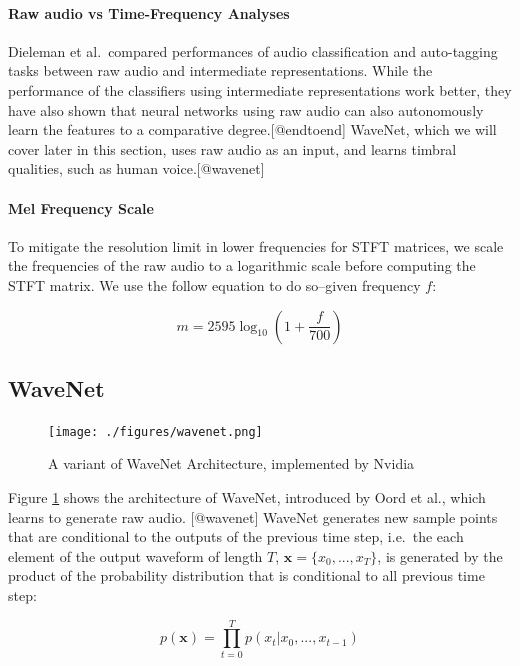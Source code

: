 \documentclass[]{report}
\begin{document}
\paragraph{Raw audio vs Time-Frequency Analyses}

Dieleman et al.~compared performances of audio classification and
auto-tagging tasks between raw audio and intermediate representations.
While the performance of the classifiers using intermediate
representations work better, they have also shown that neural networks
using raw audio can also autonomously learn the features to a
comparative degree.{[}@endtoend{]} WaveNet, which we will cover later in
this section, uses raw audio as an input, and learns timbral qualities,
such as human voice.{[}@wavenet{]}

\paragraph{Mel Frequency Scale}

To mitigate the resolution limit in lower frequencies for STFT matrices,
we scale the frequencies of the raw audio to a logarithmic scale before
computing the STFT matrix. We use the follow equation to do so--given
frequency \(f\):

\begin{equation}
    m = 2595 \log_{10} (1 + \frac{f}{700})
\end{equation}

\hypertarget{wavenet}{%
\subsection{WaveNet}\label{wavenet}}

\begin{figure}[!h]
    \texttt{[image: ./figures/wavenet.png]}
    \centering
    \caption{A variant of WaveNet Architecture, implemented by Nvidia} \label{fig:wavenet}
\end{figure}

Figure \ref{fig:wavenet} shows the architecture of WaveNet, introduced
by Oord et al., which learns to generate raw audio. {[}@wavenet{]}
WaveNet generates new sample points that are conditional to the outputs
of the previous time step, i.e.~the each element of the output waveform
of length \(T\), \(\mathbf{x} = \{x_0, ..., x_T\}\), is generated by the
product of the probability distribution that is conditional to all
previous time step:

\begin{equation}
    p(\mathbf{x}) = \prod_{t=0}^{T} p(x_t | x_0, ..., x_{t-1})
\end{equation}
\end{document}
